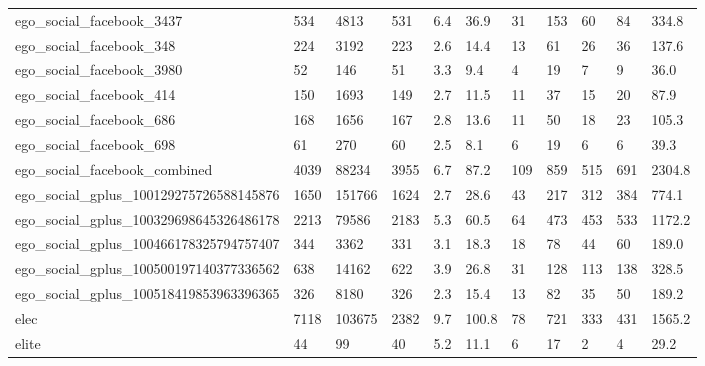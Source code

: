 \begin{longtable}{lllllllllll}
 ego\_social\_facebook\_3437                           & 534        & 4813      & 531   & 6.4    & 36.9   & 31    & 153    & 60     & 84     & 334.8   \\
 ego\_social\_facebook\_348                            & 224        & 3192      & 223   & 2.6    & 14.4   & 13    & 61     & 26     & 36     & 137.6   \\
 ego\_social\_facebook\_3980                           & 52         & 146       & 51    & 3.3    & 9.4    & 4     & 19     & 7      & 9      & 36.0    \\
 ego\_social\_facebook\_414                            & 150        & 1693      & 149   & 2.7    & 11.5   & 11    & 37     & 15     & 20     & 87.9    \\
 ego\_social\_facebook\_686                            & 168        & 1656      & 167   & 2.8    & 13.6   & 11    & 50     & 18     & 23     & 105.3   \\
 ego\_social\_facebook\_698                            & 61         & 270       & 60    & 2.5    & 8.1    & 6     & 19     & 6      & 6      & 39.3    \\
 ego\_social\_facebook\_combined                       & 4039       & 88234     & 3955  & 6.7    & 87.2   & 109   & 859    & 515    & 691    & 2304.8  \\
 ego\_social\_gplus\_100129275726588145876             & 1650       & 151766    & 1624  & 2.7    & 28.6   & 43    & 217    & 312    & 384    & 774.1   \\
 ego\_social\_gplus\_100329698645326486178             & 2213       & 79586     & 2183  & 5.3    & 60.5   & 64    & 473    & 453    & 533    & 1172.2  \\
 ego\_social\_gplus\_100466178325794757407             & 344        & 3362      & 331   & 3.1    & 18.3   & 18    & 78     & 44     & 60     & 189.0   \\
 ego\_social\_gplus\_100500197140377336562             & 638        & 14162     & 622   & 3.9    & 26.8   & 31    & 128    & 113    & 138    & 328.5   \\
 ego\_social\_gplus\_100518419853963396365             & 326        & 8180      & 326   & 2.3    & 15.4   & 13    & 82     & 35     & 50     & 189.2   \\
 elec                                               & 7118       & 103675    & 2382  & 9.7    & 100.8  & 78    & 721    & 333    & 431    & 1565.2  \\
 elite                                              & 44         & 99        & 40    & 5.2    & 11.1   & 6     & 17     & 2      & 4      & 29.2    \\

\end{longtable}
